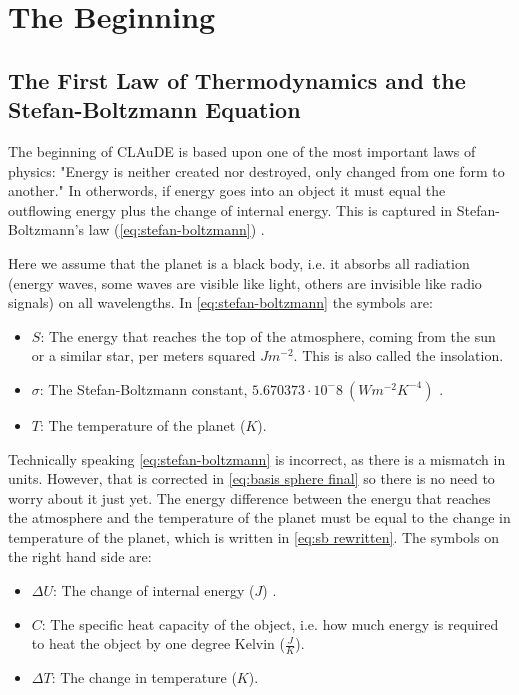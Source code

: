 \section{The Beginning}
\subsection{The First Law of Thermodynamics and the Stefan-Boltzmann Equation}
The beginning of CLAuDE is based upon one of the most important laws of physics: "Energy is neither created nor destroyed, only changed from one form to another." In otherwords, if energy goes into an object it must 
equal the outflowing energy plus the change of internal energy. This is captured in Stefan-Boltzmann's law (\autoref{eq:stefan-boltzmann}) \cite{stefan-boltzmann}. 

Here we assume that the planet is a black body, i.e. it absorbs all radiation (energy waves, some waves are visible like light, others are invisible like radio signals) on all wavelengths. 
In \autoref{eq:stefan-boltzmann} the symbols are:

\begin{itemize}
    \item $S$: The energy that reaches the top of the atmosphere, coming from the sun or a similar star, per meters squared $Jm^{-2}$. This is also called the insolation.
    \item $\sigma$: The Stefan-Boltzmann constant, $5.670373 \cdot 10^-8 \ (Wm^{-2}K^{-4})$ \cite{stefan-boltzmann}.
    \item $T$: The temperature of the planet ($K$).
\end{itemize}

Technically speaking \autoref{eq:stefan-boltzmann} is incorrect, as there is a mismatch in units. However, that is corrected in \autoref{eq:basis sphere final} so there is no need to worry about 
it just yet. The energy difference between the energu that reaches the atmosphere and the temperature of the planet must be equal to the change in temperature of the planet, which is written in 
\autoref{eq:sb rewritten}. The symbols on the right hand side are:

\begin{itemize}
    \item $\Delta U$: The change of internal energy ($J$) \cite{thermo1}.
    \item $C$: The specific heat capacity of the object, i.e. how much energy is required to heat the object by one degree Kelvin ($\frac{J}{K}$).
    \item $\Delta T$: The change in temperature ($K$).
\end{itemize}

